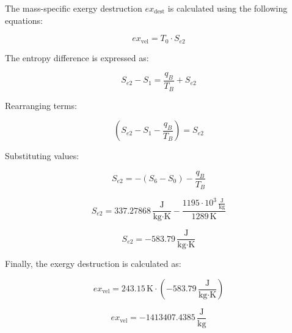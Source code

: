 The mass-specific exergy destruction \( ex_{\text{dest}} \) is calculated using the following equations:

\[
ex_{\text{vel}} = T_0 \cdot S_{e2}
\]

The entropy difference is expressed as:

\[
S_{e2} - S_1 = \frac{q_B}{T_B} + S_{e2}
\]

Rearranging terms:

\[
(S_{e2} - S_1 - \frac{q_B}{T_B}) = S_{e2}
\]

Substituting values:

\[
S_{e2} = - (S_6 - S_0) - \frac{q_B}{T_B}
\]

\[
S_{e2} = 337.27868 \, \frac{\text{J}}{\text{kg·K}} - \frac{1195 \cdot 10^3 \, \frac{\text{J}}{\text{kg}}}{1289 \, \text{K}}
\]

\[
S_{e2} = -583.79 \, \frac{\text{J}}{\text{kg·K}}
\]

Finally, the exergy destruction is calculated as:

\[
ex_{\text{vel}} = 243.15 \, \text{K} \cdot (-583.79 \, \frac{\text{J}}{\text{kg·K}})
\]

\[
ex_{\text{vel}} = -1413407.4385 \, \frac{\text{J}}{\text{kg}}
\]